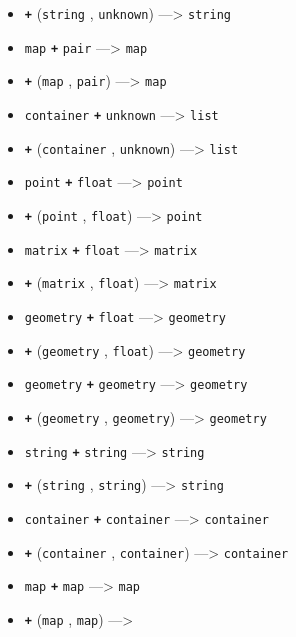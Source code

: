 \documentclass[]{book}
\theoremstyle{definition}
\theoremstyle{definition}
\theoremstyle{definition}
\theoremstyle{remark}
\begin{document}
\begin{itemize}
\item
  \textbf{\texttt{+}} (\texttt{string} , \texttt{unknown})
  ---\textgreater{} \texttt{string}
\item
  \texttt{map} \textbf{\texttt{+}} \texttt{pair} ---\textgreater{}
  \texttt{map}
\item
  \textbf{\texttt{+}} (\texttt{map} , \texttt{pair}) ---\textgreater{}
  \texttt{map}
\item
  \texttt{container} \textbf{\texttt{+}} \texttt{unknown}
  ---\textgreater{} \texttt{list}
\item
  \textbf{\texttt{+}} (\texttt{container} , \texttt{unknown})
  ---\textgreater{} \texttt{list}
\item
  \texttt{point} \textbf{\texttt{+}} \texttt{float} ---\textgreater{}
  \texttt{point}
\item
  \textbf{\texttt{+}} (\texttt{point} , \texttt{float})
  ---\textgreater{} \texttt{point}
\item
  \texttt{matrix} \textbf{\texttt{+}} \texttt{float} ---\textgreater{}
  \texttt{matrix}
\item
  \textbf{\texttt{+}} (\texttt{matrix} , \texttt{float})
  ---\textgreater{} \texttt{matrix}
\item
  \texttt{geometry} \textbf{\texttt{+}} \texttt{float} ---\textgreater{}
  \texttt{geometry}
\item
  \textbf{\texttt{+}} (\texttt{geometry} , \texttt{float})
  ---\textgreater{} \texttt{geometry}
\item
  \texttt{geometry} \textbf{\texttt{+}} \texttt{geometry}
  ---\textgreater{} \texttt{geometry}
\item
  \textbf{\texttt{+}} (\texttt{geometry} , \texttt{geometry})
  ---\textgreater{} \texttt{geometry}
\item
  \texttt{string} \textbf{\texttt{+}} \texttt{string} ---\textgreater{}
  \texttt{string}
\item
  \textbf{\texttt{+}} (\texttt{string} , \texttt{string})
  ---\textgreater{} \texttt{string}
\item
  \texttt{container} \textbf{\texttt{+}} \texttt{container}
  ---\textgreater{} \texttt{container}
\item
  \textbf{\texttt{+}} (\texttt{container} , \texttt{container})
  ---\textgreater{} \texttt{container}
\item
  \texttt{map} \textbf{\texttt{+}} \texttt{map} ---\textgreater{}
  \texttt{map}
\item
  \textbf{\texttt{+}} (\texttt{map} , \texttt{map}) ---\textgreater{}

\end{itemize}
\end{document}
